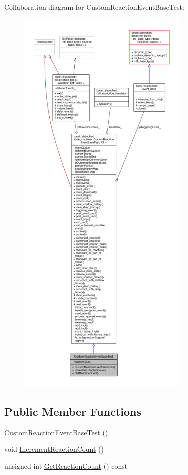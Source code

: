 Collaboration diagram for Custom\+Reaction\+Event\+Base\+Test\+:
\nopagebreak
\begin{figure}[H]
\begin{center}
\leavevmode
\includegraphics[height=550pt]{struct_custom_reaction_event_base_test__coll__graph}
\end{center}
\end{figure}
\subsection*{Public Member Functions}
\begin{DoxyCompactItemize}
\item 
\mbox{\hyperlink{struct_custom_reaction_event_base_test_a1f533013f37d3211ee87725469879fa8}{Custom\+Reaction\+Event\+Base\+Test}} ()
\item 
void \mbox{\hyperlink{struct_custom_reaction_event_base_test_aa82af380cb529195b67b6419dccf944b}{Increment\+Reaction\+Count}} ()
\item 
unsigned int \mbox{\hyperlink{struct_custom_reaction_event_base_test_ab25bee1f8c4635a60a23408e0f24ad86}{Get\+Reaction\+Count}} () const
\end{DoxyCompactItemize}

